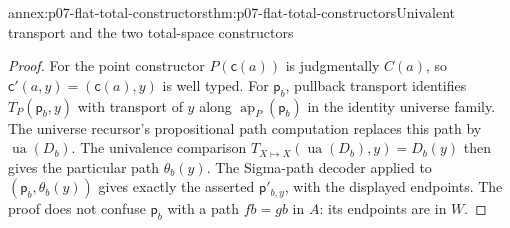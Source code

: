 \begin{annexitem}{annex:p07-flat-total-constructors}{thm:p07-flat-total-constructors}{Univalent transport and the two total-space constructors}
\begin{proof}
For the point constructor \(P(\mathsf c(a))\) is judgmentally \(C(a)\),
so \(\mathsf c'(a,y)=(\mathsf c(a),y)\) is well typed.
For \(\mathsf p_b\), pullback transport identifies
\(T_P(\mathsf p_b,y)\) with transport of \(y\) along
\(\operatorname{ap}_P(\mathsf p_b)\) in the identity universe family.
The universe recursor's propositional path computation replaces this
path by \(\operatorname{ua}(D_b)\). The univalence comparison
\(T_{X\mapsto X}(\operatorname{ua}(D_b),y)=D_b(y)\)
then gives the particular path \(\theta_b(y)\).
The Sigma-path decoder applied to
\((\mathsf p_b,\theta_b(y))\) gives exactly the asserted
\(\mathsf p'_{b,y}\), with the displayed endpoints.
The proof does not confuse \(\mathsf p_b\) with a path \(fb=gb\)
in \(A\): its endpoints are in \(W\).
\end{proof}
\end{annexitem}

